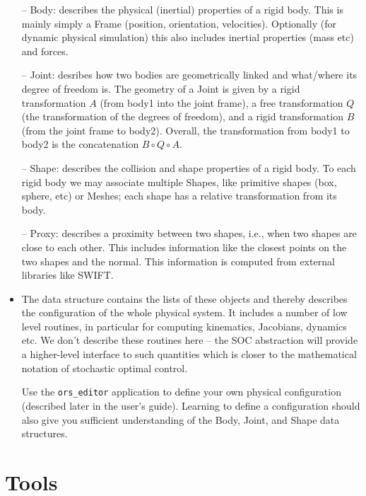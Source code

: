 \begin{itemize}
-- Body: describes the physical (inertial) properties of a rigid body.
   This is mainly simply a Frame (position, orientation,
   velocities). Optionally (for dynamic physical simulation) this also
   includes inertial properties (mass etc) and forces.

-- Joint: desribes how two bodies are geometrically linked and
   what/where its degree of freedom is. The geometry of a Joint is
   given by a rigid transformation $A$ (from body1 into the joint frame), a
   free transformation $Q$ (the transformation of the degrees of
   freedom), and a rigid transformation $B$ (from the joint frame to
   body2). Overall, the transformation from body1 to body2 is the
   concatenation $B \circ Q \circ A$.


-- Shape: describes the collision and shape properties of a rigid
   body. To each rigid body we may associate multiple Shapes, like
   primitive shapes (box, sphere, etc) or Meshes; each shape has a
   relative transformation from its body.

-- Proxy: describes a proximity between two shapes, i.e., when two
   shapes are close to each other. This includes information like the
   closest points on the two shapes and the normal. This information
   is computed from external libraries like SWIFT.

\item The  data structure contains the lists of these
   objects and thereby describes the configuration of the whole
   physical system. It includes a number of low level routines, in
   particular for computing kinematics, Jacobians, dynamics
   etc. We don't describe these routines here -- the SOC abstraction
   will provide a higher-level interface to such quantities which is
   closer to the mathematical notation of stochastic optimal control.

   Use the \lstinline$ors_editor$ application to define your own
   physical configuration (described later in the user's
   guide). Learning to define a configuration should also give you
   sufficient understanding of the Body, Joint, and Shape data
   structures.
\end{itemize}



\section{Tools}


